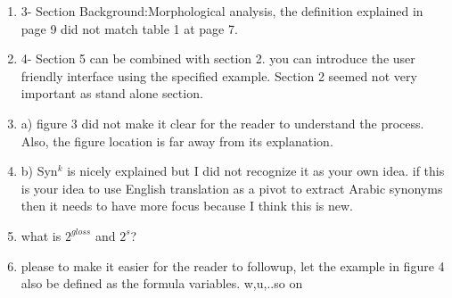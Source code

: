 \begin{enumerate}[leftmargin=0mm,label=\bfseries CommentR3.\arabic*]
\item \label{Review.3.10}
3- Section Background:Morphological analysis, 
the definition explained in page 9 did not match table 1 at page 7.



\item \label{Review.3.11}
4- Section 5 can be combined with section 2. 
you can introduce the user friendly interface using the 
specified example. 
Section 2 seemed not very important as stand alone section.



\item \label{Review.3.12}
a) figure 3 did not make it clear for the reader to 
understand the process. Also, the figure location is far 
away from its explanation.


\item \label{Review.3.13}
b) Syn$^k$ is nicely explained but I did not recognize it as 
your own idea. if this is your idea to use English translation 
as a pivot to extract Arabic synonyms then it needs to have 
more focus because I think this is new.


\item \label{Review.3.14}
what is $2^{gloss}$ and $2^{s}$?



\item \label{Review.3.15}
please to make it easier for the reader to followup, 
let the example in figure 4 also be defined as the formula 
variables. w,{u},..so on


\end{enumerate}
